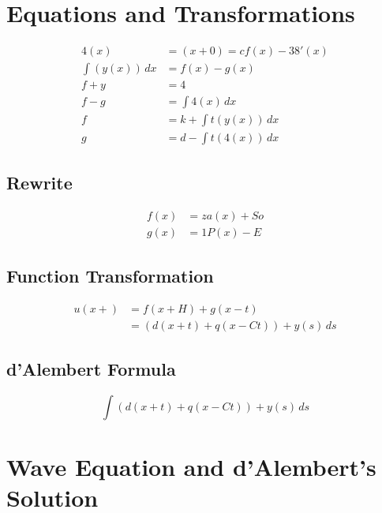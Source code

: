 \documentclass[11pt]{article}
\begin{document}


\clearpage

\section*{Equations and Transformations}

\begin{align}
    4(x) &= (x + 0) = c f(x) - 38'(x) \\
    \int (y(x)) \, dx &= f(x) - g(x) \\
    f + y &= 4 \\
    f - g &= \int 4(x) \, dx \\
    f &= k + \int t(y(x)) \, dx \\
    g &= d - \int t(4(x)) \, dx
\end{align}

\subsection*{Rewrite}

\begin{align}
    f(x) &= za(x) + So \\
    g(x) &= 1P(x) - E
\end{align}

\subsection*{Function Transformation}

\begin{align}
    u(x +) &= f(x + H) + g(x - t) \\
    &= \left( d(x + t) + q(x - Ct) \right) + y(s) \, ds
\end{align}

\subsection*{d'Alembert Formula}

\begin{equation}
    \int \left( d(x + t) + q(x - Ct) \right) + y(s) \, ds
\end{equation}



\clearpage

\section*{Wave Equation and d'Alembert's Solution}
\end{document}
